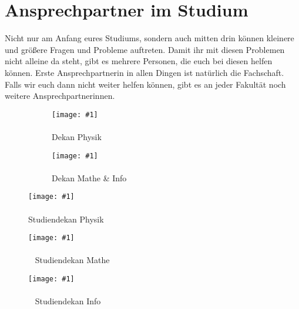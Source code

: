 \section*{Ansprechpartner im Studium}

Nicht nur am Anfang eures Studiums, sondern auch mitten drin können kleinere und größere Fragen und Probleme auftreten. Damit ihr mit diesen Problemen nicht alleine da steht, gibt es mehrere Personen, die euch bei diesen helfen können. Erste Ansprechpartnerin in allen Dingen ist natürlich die Fachschaft. Falls wir euch dann nicht weiter helfen können, gibt es an jeder Fakultät noch weitere Ansprechpartnerinnen.

\newcommand{\proffoto}[2]{
    \centering
    \texttt{[image: \#1]}\\
    #2
    \vspace{4mm}
}

\begin{figure}[b]
	\vspace*{4mm}
    \begin{subfigure}{.50\linewidth}
        \ifdefined\dekanphysikfoto
        \proffoto{\dekanphysikfoto}{\dekanphysiklang\\[-1ex]{\scriptsize Dekan Physik}}
        \fi
    \end{subfigure}
    \begin{subfigure}{.42\linewidth}
    	\vspace{-8mm} %

        \ifdefined\dekanmathefoto
        \proffoto{\dekanmathefoto}{\dekanmathelang\\[-1ex]{\scriptsize Dekan Mathe \& Info}}
        \fi
    \end{subfigure}
\end{figure}

\begin{figure*}
    \centering
    \begin{subfigure}{.3\linewidth}
        \ifdefined\studiendekanphysikfoto
        \proffoto{\studiendekanphysikfoto}{\studiendekanphysik\\[-1ex]{\scriptsize Studiendekan Physik}}
        \fi
    \end{subfigure}
    \begin{subfigure}{.3\linewidth}
        \ifdefined\studiendekanmathefoto
        \proffoto{\studiendekanmathefoto}{\studiendekanmathe\\[-1ex]{\scriptsize ~ Studiendekan Mathe}}
        \fi
    \end{subfigure}
    \begin{subfigure}{.3\linewidth}
        \ifdefined\studiendekaninformatikfoto
        \proffoto{\studiendekaninformatikfoto}{\studiendekaninformatik\\[-1ex]{\scriptsize ~ Studiendekan Info}}
        \fi
    \end{subfigure}
\end{figure*}


